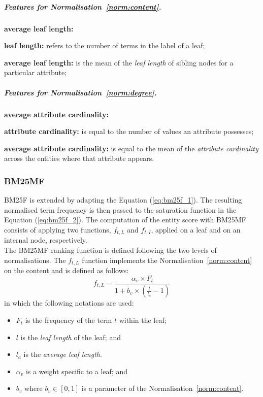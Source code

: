 \subparagraph{Features for Normalisation~\ref{norm:content}.}

\begin{labeling}{\textbf{average leaf length:}}
  \item[\textbf{leaf length:}] refers to the number of terms in the label of a leaf;
  \item[\textbf{average leaf length:}] is the mean of the \emph{leaf length} of sibling nodes for a particular attribute;
\end{labeling}

\subparagraph{Features for Normalisation~\ref{norm:degree}.}

\begin{labeling}{\textbf{average attribute cardinality:}}
  \item[\textbf{attribute cardinality:}] is equal to the number of values an attribute possesses;
  \item[\textbf{average attribute cardinality:}] is equal to the mean of the \emph{attribute cardinality} across the entities where that attribute appears.
\end{labeling}

\subsubsection{BM25MF}
\label{sec:bm25mf-function}

BM25F is extended by adapting the Equation (\ref{eq:bm25f_1}). The resulting normalised term frequency is then passed to the saturation function in the Equation (\ref{eq:bm25f_2}).
The computation of the entity score with \gls{BM25MF} consists of applying two functions, $f_{t,L}$ and $f_{t,I}$, applied on a leaf and on an internal node, respectively.\\

The \gls{BM25MF} ranking function is defined following the two levels of normalisations.
The $f_{t,L}$ function implements the Normalisation~\ref{norm:content} on the content and is defined as follows:
\begin{equation}
\label{chap6:ranking:bm25mf_v}
f_{t,L} = \frac{\alpha_v\times F_t}{1+b_v\times\left(\frac{l}{l_a}-1\right)}
\end{equation}
in which the following notations are used:
\begin{itemize}
	\item $F_t$ is the frequency of the term $t$ within the leaf;
	\item $l$ is the \emph{leaf length} of the leaf; and
	\item $l_a$ is the \emph{average leaf length}.
	\item $\alpha_v$ is a weight specific to a leaf; and
	\item $b_v$ where $b_v \in \left[0,1\right]$ is a parameter of the Normalisation~\ref{norm:content}.
\end{itemize}


